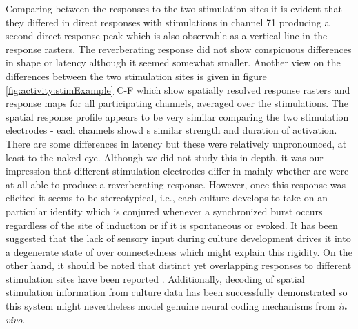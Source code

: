     Comparing between the responses to the two stimulation sites it is evident that they differed in direct responses with stimulations in channel 71 producing a second direct response peak which is also observable as a vertical line in the response rasters. The reverberating response did not show conspicuous differences in shape or latency although it seemed somewhat smaller. Another view on the differences between the two stimulation sites is given in figure \ref{fig:activity:stimExample} C-F which show spatially resolved response rasters and response maps for all participating channels, averaged over the stimulations. The spatial response profile appears to be very similar comparing the two stimulation electrodes - each channels showd s similar strength and duration of activation. There are some differences in latency but these were relatively unpronounced, at least to the naked eye. Although we did not study this in depth, it was our impression that different stimulation electrodes differ in mainly whether are were at all able to produce a reverberating response. However, once this response was elicited it seems to be stereotypical, i.e., each culture develops to take on an particular identity which is conjured whenever a synchronized burst occurs regardless of the site of induction or if it is spontaneous or evoked. It has been suggested that the lack of sensory input during culture development drives it into a degenerate state of over connectedness which might explain this rigidity. On the other hand, it should be noted that distinct yet overlapping responses to different stimulation sites have been reported \cite{wagenaar2006searching}. Additionally, decoding of spatial stimulation information from culture data has been successfully demonstrated \cite{kermany2010tradeoffs} so this system might nevertheless model genuine neural coding mechanisms from \textit{in vivo}.

